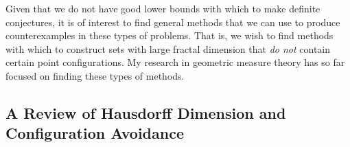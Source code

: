 \documentclass[11pt]{article}
\DeclareMathOperator{\RR}{\mathbb{R}}
\begin{document}
Given that we do not have good lower bounds with which to make definite conjectures, it is of interest to find general methods that we can use to produce counterexamples in these types of problems. That is, we wish to find methods with which to construct sets with large fractal dimension that \emph{do not} contain certain point configurations. My research in geometric measure theory has so far focused on finding these types of methods.

\subsection{A Review of Hausdorff Dimension and Configuration Avoidance}


\end{document}
